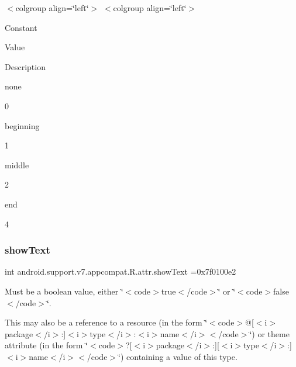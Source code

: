 \tabulinesep=1mm
\begin{longtabu} spread 0pt [c]{*{0}{|X[-1]}|}
\hline
\end{longtabu}
$<$colgroup align=\char`\"{}left\char`\"{}$>$ $<$colgroup align=\char`\"{}left\char`\"{}$>$ 

Constant

Value

Description 

{\ttfamily none}

0

{\ttfamily beginning}

1

{\ttfamily middle}

2

{\ttfamily end}

4\mbox{\label{classandroid_1_1support_1_1v7_1_1appcompat_1_1R_1_1attr_a0d2df05a7372eac5cd163b46c11f5dad}} 
\subsubsection{\texorpdfstring{show\+Text}{showText}}
{\footnotesize\ttfamily int android.\+support.\+v7.\+appcompat.\+R.\+attr.\+show\+Text =0x7f0100e2\hspace{0.3cm}{\ttfamily [static]}}

Must be a boolean value, either \char`\"{}$<$code$>$true$<$/code$>$\char`\"{} or \char`\"{}$<$code$>$false$<$/code$>$\char`\"{}. 

This may also be a reference to a resource (in the form \char`\"{}$<$code$>$@\mbox{[}$<$i$>$package$<$/i$>$\+:\mbox{]}$<$i$>$type$<$/i$>$\+:$<$i$>$name$<$/i$>$$<$/code$>$\char`\"{}) or theme attribute (in the form \char`\"{}$<$code$>$?\mbox{[}$<$i$>$package$<$/i$>$\+:\mbox{]}\mbox{[}$<$i$>$type$<$/i$>$\+:\mbox{]}$<$i$>$name$<$/i$>$$<$/code$>$\char`\"{}) containing a value of this type. \mbox{\label{classandroid_1_1support_1_1v7_1_1appcompat_1_1R_1_1attr_abbdfaca6ed87df489ea318ca3fbebc86}} 
